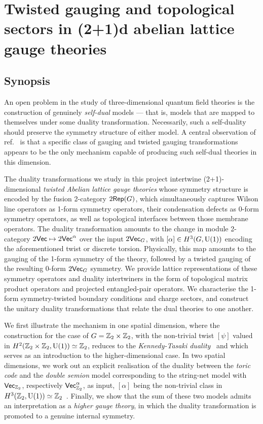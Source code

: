 \chapter{Twisted gauging and topological sectors in (2+1)d abelian lattice gauge theories}\label{app:TwistedGauging}
\section{Synopsis}
An open problem in the study of three-dimensional quantum field theories is the construction of genuinely \emph{self-dual} models --- that is, models that are mapped to themselves under some duality transformation. Necessarily, such a self-duality should preserve the symmetry structure of either model. A central observation of ref.~\cite{Decoppet2023} is that a specific class of gauging and twisted gauging transformations appears to be the only mechanism capable of producing such self-dual theories in this dimension.

The duality transformations we study in this project intertwine (2+1)-dimensional \emph{twisted Abelian lattice gauge theories} whose symmetry structure is encoded by the fusion 2-category $2\mathsf{Rep}(G)$, which simultaneously captures Wilson line operators as 1-form symmetry operators, their condensation defects as 0-form symmetry operators, as well as topological interfaces between those membrane operators. The duality transformation amounts to the change in module 2-category $2\mathsf{Vec}\mapsto2\mathsf{Vec}^\alpha$ over the input $2\mathsf{Vec}_G$, with $[\alpha]\in H^3(G,{\rm U}(1))$ encoding the aforementioned twist or discrete torsion. Physically, this map amounts to the gauging of the 1-form symmetry of the theory, followed by a twisted gauging of the resulting 0-form $2\mathsf{Vec}_G$ symmetry. We provide lattice representations of these symmetry operators and duality intertwiners in the form of topological matrix product operators and projected entangled-pair operators. We characterise the 1-form symmetry-twisted boundary conditions and charge sectors, and construct the unitary duality transformations that relate the dual theories to one another.

We first illustrate the mechanism in one spatial dimension, where the construction for the case of $G=\mathbb Z_2\times\mathbb Z_2$, with the non-trivial twist $[\psi]$ valued in $H^2(\mathbb Z_2\times\mathbb Z_2,{\rm U}(1))\simeq\mathbb Z_2$, reduces to the \emph{Kennedy-Tasaki duality}~\cite{Kennedy1992} and which serves as an introduction to the higher-dimensional case. In two spatial dimensions, we work out an explicit realisation of the duality between the \emph{toric code} and the \emph{double semion} model corresponding to the string-net model with $\mathsf{Vec}_{\mathbb Z_2}$, respectively $\mathsf{Vec}_{\mathbb Z_2}^\alpha$, as input, $[\alpha]$ being the non-trivial class in $H^3(\mathbb Z_2,{\rm U}(1))\simeq\mathbb Z_2$~\cite{Kitaev1997,Levin2004,Levin2012}. Finally, we show that the sum of these two models admits an interpretation as a \emph{higher gauge theory}, in which the duality transformation is promoted to a genuine internal symmetry.
